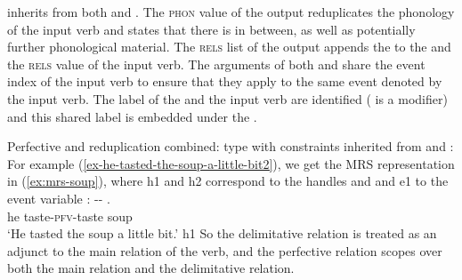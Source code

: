  inherits from both  and .
The \textsc{phon} value of the output reduplicates the phonology of the input verb and states that there is  in between, 
as well as potentially further phonological material.
The \textsc{rels} list of the output appends the  to the  and the \textsc{rels} value of the input verb.
The arguments of both  and  share the event index of the
input verb  to ensure that they apply to the same event denoted by the input verb. 
The label of the  and the input verb are identified ( is a modifier) 
and this shared label is embedded under the .

\ea\label{avm:pfv-redup}
Perfective and reduplication combined: type  with
constraints inherited from  and :\\
\z
For example %
 (\ref{ex-he-tasted-the-soup-a-little-bit2}), we get the  MRS representation in (\ref{ex:mrs-soup}),
where h1 and h2 correspond to the handles  and  and e1 to the event variable :
\ea\label{ex-he-tasted-the-soup-a-little-bit2}
    \gll {} -- .\\
    he taste-\textsc{pfv}-taste soup\\
    \glt `He tasted the soup a little bit.'
 \z
\ea\label{ex:mrs-soup}
h1 
\z
So the delimitative relation is treated as an adjunct to the main relation of the verb, 
and the perfective relation scopes over both the main relation and the delimitative relation.

